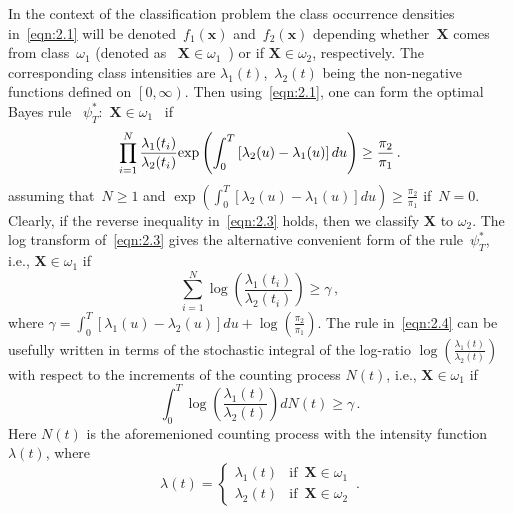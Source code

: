 \documentclass[lettersize,journal,onecolumn]{IEEEtran}
\theoremstyle{definition}
\begin{document}
In the context of the classification problem the class occurrence densities 
in~\eqref{eqn:2.1} will be denoted~$f_1(\mathbf{x})$ and~$f_2(\mathbf{x})$ depending 
whether~$\mathbf{X}$ comes from class~$\omega_{1}$ (denoted as \mbox{
	$\mathbf{X} \in \omega_{1}$
}) or if \mbox{$\mathbf{X} \in \omega_{2}$}, respectively. The corresponding class
intensities are \mbox{$\lambda_{1}(t)$, $\lambda_{2}(t)$} being the non-negative 
functions defined on \mbox{$\left[0, \infty\right)$}. Then using~\eqref{eqn:2.1}, 
one can form the optimal Bayes rule \mbox{
	$\psi_{T}^{*}$: $\mathbf{X}\in\omega_{1}$
} if 
\begin{equation}
	\prod_{i=1}^{N}\frac{\lambda_{1}(t_{i})}{\lambda_{2}(t_{i})}
	{\rm exp}\left(\int_{0}^{T}\left[\lambda_{2}(u)-\lambda_{1}(u)\right]du\right)
	\geq\frac{\pi_{2}}{\pi_{1}}
	\label{eqn:2.3} \,.
\end{equation}
assuming that~$N\geq1$ and 
$
\exp\left(\int_{0}^{T}\left[\lambda_{2}(u)-\lambda_{1}(u)\right]du\right) 
\geq \frac{\pi_{2}}{\pi_{1}}
$ if~$N=0$. Clearly, if the reverse inequality in~\eqref{eqn:2.3} holds, then we 
classify $\mathbf{X}$ to $\omega_{2}$. The log transform of~\eqref{eqn:2.3} gives the 
alternative convenient form 
of the rule~$\psi_{T}^{*}$, i.e., \mbox{$\mathbf{X}\in\omega_{1}$} if 
\begin{equation}
	\sum_{i=1}^{N}\log
	\left(\frac{\lambda_{1}(t_{i})}{\lambda_{2}(t_{i})}\right)
	\geq\gamma
	\label{eqn:2.4} \,,
\end{equation}
where \mbox{$
	\gamma=
	\int_{0}^{T}\left[\lambda_{1}(u)-\lambda_{2}(u)\right]du +
	\log\left(\frac{\pi_{2}}{\pi_{1}}\right)
	$}. The rule in~\eqref{eqn:2.4} can be usefully written in terms of the stochastic 
integral of the log-ratio $\log\left(\frac{\lambda_{1}(t)}{\lambda_{2}(t)}\right)$ 
with respect to the increments of the counting process $N(t)$, i.e., 
\mbox{$\mathbf{X}\in\omega_{1}$} if 
\begin{equation}
	\int_{0}^{T}
	\log
	\left(\frac{\lambda_{1}(t)}{\lambda_{2}(t)}\right)
	dN(t)
	\geq\gamma
	\label{eqn:2.4a} \,.
\end{equation}
Here $N(t)$ is the aforemenioned counting process with the intensity function 
$\lambda(t)$, where
\begin{equation}
	\lambda(t) = 
	\begin{cases}
		\lambda_{1}(t) & \text{if} \enspace \mathbf{X}\in\omega_{1} \\
		\lambda_{2}(t) & \text{if} \enspace \mathbf{X}\in\omega_{2}
	\end{cases}
	\label{eqn:2.4b} \,.
\end{equation}
\end{document}
